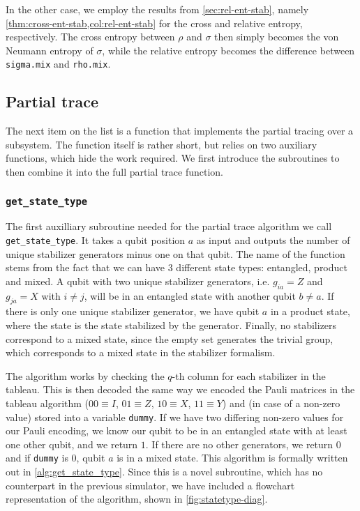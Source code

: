 In the other case, we employ the results from \cref{sec:rel-ent-stab}, namely
\cref{thm:cross-ent-stab,col:rel-ent-stab} for the cross and relative entropy,
respectively.  The cross entropy between $\rho$ and $\sigma$ then simply
becomes the von Neumann entropy of $\sigma$, while the relative entropy becomes
the difference between \verb|sigma.mix| and \verb|rho.mix|.

\newpage
\subsection{Partial trace}\label{sec:ptrace}
The next item on the list is a function that implements the partial tracing
over a subsystem. The function itself is rather short, but relies on two
auxiliary functions, which hide the work required. We first introduce the
subroutines to then combine it into the full partial trace function.

\subsubsection{\texttt{get\_state\_type}}
The first auxilliary subroutine needed for
the partial trace algorithm we call \texttt{get\_state\_type}. It
takes a qubit position $a$ as input and outputs the number of unique stabilizer
generators minus one on that qubit. The name of the function stems from the
fact that we can have $3$ different state types: entangled, product and mixed.
A qubit with two unique stabilizer generators, i.e. $g_{ia} = Z$ and $g_{ja} =
X$ with $i\neq j$, will be in an entangled state with another qubit $b\neq a$.
If there is only one unique stabilizer generator, we have qubit $a$ in a
product state, where the state is the state stabilized by the generator.
Finally, no stabilizers correspond to a mixed state, since the empty set
generates the trivial group, which corresponds to a mixed state in the
stabilizer formalism.

The algorithm works by checking the $q$-th column for
each stabilizer in the tableau. This is then decoded the same way we encoded
the Pauli matrices in the tableau algorithm ($00 \equiv I$, $01\equiv Z$, $10
\equiv X$, $11 \equiv Y$) and (in case of a non-zero value) stored into a
variable \texttt{dummy}. If we have two differing non-zero values for our Pauli
encoding, we know our qubit to be in an entangled state with at least one other
qubit, and we return $1$. If there are no other generators, we return $0$ and
if \texttt{dummy} is $0$, qubit $a$ is in a mixed state. This algorithm is
formally written out in \cref{alg:get_state_type}. Since this is a novel
subroutine, which has no counterpart in the previous simulator, we have
included a flowchart representation of the algorithm, shown in
\cref{fig:statetype-diag}.
%

